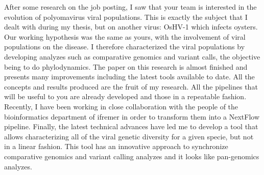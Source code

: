 \documentclass[11pt, a4paper]{awesome-cv}
\begin{document}
\begin{cvletter}
After some research on the job posting, I saw that your team is interested in the evolution of polyomavirus viral populations. This is exactly the subject that I dealt with during my thesis, but on another virus: OsHV-1 which infects oysters. Our working hypothesis was the same as yours, with the involvement of viral populations on the disease. I therefore characterized the viral populations by developing analyzes such as comparative genomics and variant calls, the objective being to do phylodynamics. The paper on this research is almost finished and presents many improvements including the latest tools available to date. All the concepts and results produced are the fruit of my research. All the pipelines that will be useful to you are already developed and those in a repeatable fashion. Recently, I have been working in close collaboration with the people of the bioinformatics department of ifremer in order to transform them into a NextFlow pipeline. Finally, the latest technical advances have led me to develop a tool that allows characterizing all of the viral genetic diversity for a given specie, but not in a linear fashion. This tool has an innovative approach to synchronize comparative genomics and variant calling analyzes and it looks like pan-genomics analyzes.

\end{cvletter}


\makeletterclosing
\end{document}
